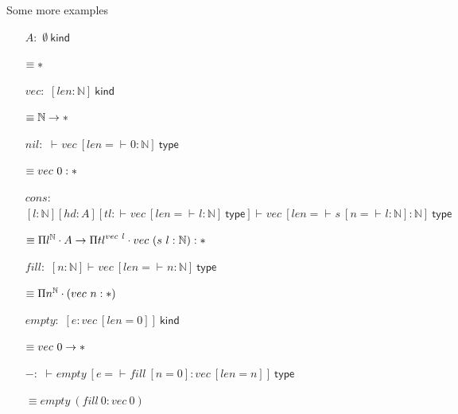 \documentclass[ignorenonframetext,red]{beamer}
\newcommand\postbinder{\cdot}
\newcommand\prd[2]{\ensuremath\Pi{#1}^{#2}\postbinder}
\newcommand\app[1]{{#1}\ }
\newcommand\srt[1]{\ensuremath\mathsf{#1}}
\newcommand\type{\srt *}
\newcommand\eent[1]{\left[{#1}\right]}
\newcommand\econs[2]{{#1}\eent{#2}}
\newcommand\esing[1]{\econs{}{#1}}
\newcommand\jlangt[4]{{#2}\vdash_{\mathrm{#1}}{#3}:{#4}}
\newcommand\jlangA[3]{{#2}\vdash_{\mathrm{#1}}{#3}\mathsf{\ type}}
\newcommand\jlangK[3]{{#2}\vdash_{\mathrm{#1}}{#3}\mathsf{\ kind}}
\newcommand\jnlft[3]{\jlangt{}{#1}{#2}{#3}}
\newcommand\jnlfA[2]{\jlangA{}{#1}{#2}}
\newcommand\jnlfK[1]{{#1}\ \mathsf{kind}} %
\newcommand\nat{\mathbb N}
\newenvironment{smallright}{
  \begin{flushright}
    \footnotesize
  }{
  \end{flushright}
}
\begin{document}
\begin{frame}{Some more examples}
  \begin{enumerate}
  \item[$A:$] $\jnlfK\emptyset$
    \begin{smallright}
      $\equiv \type$
    \end{smallright}
  \item[$vec:$]
    $\jnlfK{\esing{len:\nat}}$
    \begin{smallright}
      $\equiv \nat\to\type$
    \end{smallright}
  \item[$nil:$]
    $\jnlfA{}{\app{vec}\esing{len=\jnlft{}{0}{\nat}}}$
    \begin{smallright}
      \footnotesize $\equiv \app{vec} 0 : \type$
    \end{smallright}
  \item[$cons:$]
    $\jnlfA { \econs{ \econs{ \esing{l:\nat}} {hd:A}}
      {tl:\jnlfA{}{ \app {vec} {\esing{len=\jnlft{}{l}{\nat}}}}}}
    {\app{vec} {\esing{len =\jnlft{}{\app s {\esing{n =
                \jnlft{}{l}{\nat}}}}{\nat}}}}$
    \begin{smallright}
      $\equiv \prd l \nat A\to \prd {tl} {\app {vec} l}
      \app {vec} (\app s l : \nat) : \type$
    \end{smallright}
  \item[$fill:$]
    $\jnlfA{\esing{n:\nat}}{\app{vec}{\esing{len=\jnlft{}{n}{\nat}}}}$
    \begin{smallright}
      $\equiv \prd n \nat (\app{vec} n : \type)$
    \end{smallright}
  \item[$empty:$]
    $\jnlfK{\esing{e:\app{vec}\esing{len=0}}}$
    \begin{smallright}
      $\equiv \app{vec} 0\to \type$
    \end{smallright}
  \item[$-:$]
    $\jnlfA{}{\app{empty}\esing{e=\jnlft{}{\app{fill}\esing{n=0}}{\app{vec}\esing{len=n}}}}$
    \begin{smallright}
      $\equiv \app{empty}(\app{fill} 0 : \app{vec} 0)$
    \end{smallright}
  \end{enumerate}
\end{frame}
\end{document}
